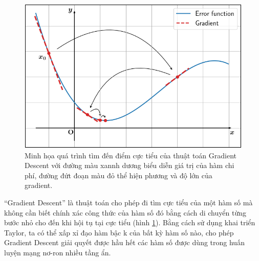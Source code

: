 \begin{figure}[H]
	\centering
	\includegraphics[width=140 mm]{images/gd.png}
	\caption{Minh họa quá trình tìm đến điểm cực tiểu của thuật toán Gradient Descent với đường màu xannh dương biểu diễn giá trị của hàm chi phí, đường đứt đoạn màu đỏ thể hiện phương và độ lớn của gradient.}
	\label{fig:gd}
\end{figure}

``Gradient Descent'' là thuật toán cho phép đi tìm cực tiểu của một hàm số mà không cần biết chính xác công thức của hàm số đó bằng cách di chuyển từng bước nhỏ cho đến khi hội tụ tại cực tiểu (hình \ref{fig:gd}). Bằng cách sử dụng khai triển Taylor, ta có thể xấp xỉ đạo hàm bậc k của bất kỳ hàm số nào, cho phép Gradient Descent giải quyết được hầu hết các hàm số được dùng trong huấn luyện mạng nơ-ron nhiều tầng ẩn.

